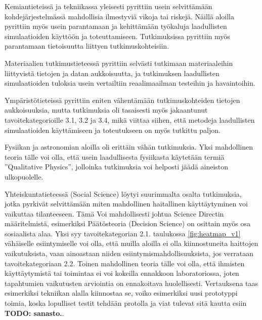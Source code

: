 \documentclass[utf8]{gradu3}
\begin{document}
Kemiantieteissä ja tekniikassa yleisesti 
pyrittiin usein selvittämään kohdejärjestelmässä mahdollisia 
ilmestyviä vikoja tai riskejä.
Näillä aloilla pyrittiin myös usein parantamaan ja 
kehittämään työkaluja laadullisten simulaatioiden käyttöön ja toteuttamiseen.
Tutkimuksissa pyrittiin myös parantamaan tietoisuutta liittyen tutkimuskohteisiin.

Materiaalien tutkimustieteessä pyrittiin selvästi 
tutkimaan materiaaleihin  liittyvistä tietojen ja datan aukkoisuutta, 
ja tutkimuksen laadullisten simulaatioiden tuloksia usein vertailtiin reaalimaailman testeihin ja havaintoihin.

Ympäristötieteissä pyrittiin eniten vähentämään tutkimuskohteiden tietojen aukkoisuuksia, mutta tutkimuksia oli tasaisesti myös jakaantunut tavoitekategorioille 3.1, 3.2 ja 3.4, mikä viittaa siihen, että
metodeja laadullisten simulaatioiden käyttämiseen ja toteutukseen on myös
tutkittu paljon.

Fysiikan ja astronomian aloilla oli erittäin vähän tutkimuksia.
Yksi mahdollinen teoria tälle voi olla,
että usein laadullisesta fysiikasta käytetään termiä ''Qualitative Physics'', jolloinka tutkimuksia voi helposti jäädä aineiston ulkopuolelle.

Yhteiskuntatieteessä (Social Science) löytyi suurimmalta osalta tutkimuksia, 
jotka pyrkivät selvittämään miten mahdollinen haitallinen käyttäytyminen voi vaikuttaa
tilanteeseen. Tämä Voi mahdollisesti johtua Science Directin määritelmistä, esimerkiksi
Päätösteoria (Decision Science) on osittain myös osa sosiaalista alaa. 
Yksi syy tavoitekategorian 2.1. taulukossa \ref{fig:heatmap_v1}
vähäiselle esiintymiselle voi olla, 
että muilla aloilla ei olla kiinnostuneita haittojen vaikutuksista,
vaan ainoastaan niiden esiintymismahdollisuuksista, 
jos verrataan tavoitekategoriaan 2.2.
Toinen mahdollinen teoria tälle voi olla, 
että ihmisten käyttäytymistä tai toimintaa ei voi kokeilla ennakkoon laboratoriossa, 
joten tapahtumien vaikutusten arviointia on ennakoitava huolellisesti.
Vertauksena taas esimerkiksi tekniikan alalla kiinnostaa se, 
voiko esimerkiksi uusi prototyppi toimia, koska lopulliset testit tehdään protolla 
ja viat tulevat sitä kautta esiin \textbf{TODO: sanasto.}.
\end{document}
